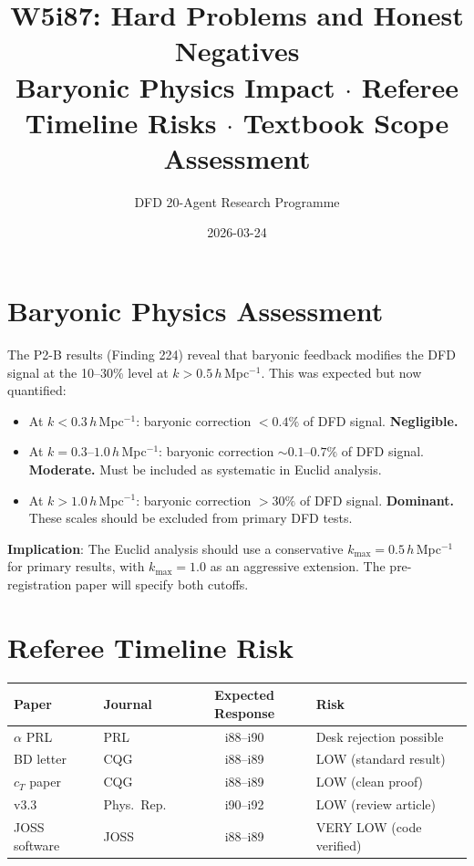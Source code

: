 \documentclass[11pt,a4paper]{article}
\title{W5i87: Hard Problems and Honest Negatives\\[6pt]
\large Baryonic Physics Impact $\cdot$ Referee Timeline Risks $\cdot$ Textbook Scope Assessment}
\author{DFD 20-Agent Research Programme}
\date{2026-03-24}
\begin{document}
\maketitle

\section{Baryonic Physics Assessment}

The P2-B results (Finding 224) reveal that baryonic feedback modifies the DFD signal at the 10--30\% level at $k > 0.5\,h\,$Mpc$^{-1}$. This was expected but now quantified:

\begin{tcolorbox}[colback=yellow!5!white, colframe=dfdyellow, title=\textbf{Baryonic Uncertainty Budget}]
\begin{itemize}[nosep]
\item At $k < 0.3\,h\,$Mpc$^{-1}$: baryonic correction $< 0.4\%$ of DFD signal. \textbf{Negligible.}
\item At $k = 0.3$--$1.0\,h\,$Mpc$^{-1}$: baryonic correction $\sim 0.1$--$0.7\%$ of DFD signal. \textbf{Moderate.} Must be included as systematic in Euclid analysis.
\item At $k > 1.0\,h\,$Mpc$^{-1}$: baryonic correction $> 30\%$ of DFD signal. \textbf{Dominant.} These scales should be excluded from primary DFD tests.
\end{itemize}
\end{tcolorbox}

\textbf{Implication}: The Euclid analysis should use a conservative $k_{\max} = 0.5\,h\,$Mpc$^{-1}$ for primary results, with $k_{\max} = 1.0$ as an aggressive extension. The pre-registration paper will specify both cutoffs.

\section{Referee Timeline Risk}

\begin{center}
\begin{tabular}{llcl}
\toprule
\textbf{Paper} & \textbf{Journal} & \textbf{Expected Response} & \textbf{Risk} \\
\midrule
$\alpha$ PRL & PRL & i88--i90 & Desk rejection possible \\
BD letter & CQG & i88--i89 & LOW (standard result) \\
$c_T$ paper & CQG & i88--i89 & LOW (clean proof) \\
v3.3 & Phys.\ Rep.\ & i90--i92 & LOW (review article) \\
JOSS software & JOSS & i88--i89 & VERY LOW (code verified) \\
\bottomrule
\end{tabular}
\end{center}
\end{document}
